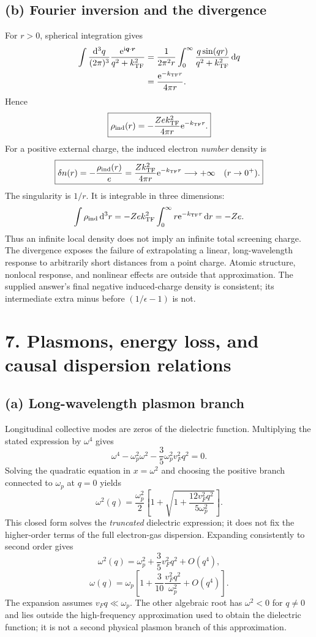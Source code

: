\subsection*{(b) Fourier inversion and the divergence}
For $r>0$, spherical integration gives
\begin{align*}
\int\frac{\mathop{}\!\mathrm{d}^3q}{(2\pi)^3}
\frac{\mathrm{e}^{\mathrm{i}\boldsymbol{q}\cdot\boldsymbol{r}}}{q^2+k_{\rm TF}^2}
&=\frac1{2\pi^2r}\int_0^\infty
\frac{q\sin(qr)}{q^2+k_{\rm TF}^2}\mathop{}\!\mathrm{d} q\\
&=\frac{\mathrm{e}^{-k_{\rm TF}r}}{4\pi r}.
\end{align*}
Hence
\[
\boxed{\rho_{\rm ind}(r)=-\frac{Ze k_{\rm TF}^2}{4\pi r}
\mathrm{e}^{-k_{\rm TF}r}.}
\]
For a positive external charge, the induced electron \emph{number} density is
\[
\boxed{\delta n(r)=-\frac{\rho_{\rm ind}(r)}e
=\frac{Zk_{\rm TF}^2}{4\pi r}\mathrm{e}^{-k_{\rm TF}r}
\longrightarrow+\infty\quad(r\to0^+).}
\]
The singularity is $1/r$. It is integrable in three dimensions:
\[
\int\rho_{\rm ind}\mathop{}\!\mathrm{d}^3r
=-Ze k_{\rm TF}^2\int_0^\infty r\mathrm{e}^{-k_{\rm TF}r}\mathop{}\!\mathrm{d} r
=-Ze.
\]
Thus an infinite local density does not imply an infinite total screening charge. The divergence exposes the failure of extrapolating a linear, long-wavelength response to arbitrarily short distances from a point charge. Atomic structure, nonlocal response, and nonlinear effects are outside that approximation. The supplied answer's final negative induced-charge density is consistent; its intermediate extra minus before $(1/\epsilon-1)$ is not.

\section*{7. Plasmons, energy loss, and causal dispersion relations}
\subsection*{(a) Long-wavelength plasmon branch}
Longitudinal collective modes are zeros of the dielectric function. Multiplying the stated expression by $\omega^4$ gives
\[
\omega^4-\omega_p^2\omega^2-\frac35\omega_p^2v_F^2q^2=0.
\]
Solving the quadratic equation in $x=\omega^2$ and choosing the positive branch connected to $\omega_p$ at $q=0$ yields
\[
\omega^2(q)=\frac{\omega_p^2}{2}
\left[1+\sqrt{1+\frac{12v_F^2q^2}{5\omega_p^2}}\right].
\]
This closed form solves the \emph{truncated} dielectric expression; it does not fix the higher-order terms of the full electron-gas dispersion. Expanding consistently to second order gives
\[
\boxed{\omega^2(q)=\omega_p^2+\frac35v_F^2q^2+O(q^4),}
\]
\[
\boxed{\omega(q)=\omega_p\left[1+\frac3{10}
\frac{v_F^2q^2}{\omega_p^2}+O(q^4)\right].}
\]
The expansion assumes $v_Fq\ll\omega_p$. The other algebraic root has $\omega^2<0$ for $q\ne0$ and lies outside the high-frequency approximation used to obtain the dielectric function; it is not a second physical plasmon branch of this approximation.

